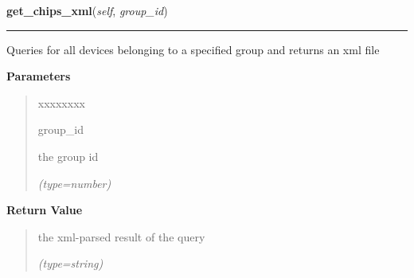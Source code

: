 \hspace{.8\funcindent}\begin{boxedminipage}{\funcwidth}

    \raggedright \textbf{get\_chips\_xml}(\textit{self}, \textit{group\_id})

    \vspace{-1.5ex}

    \rule{\textwidth}{0.5\fboxrule}
\setlength{\parskip}{2ex}
    Queries for all devices belonging to a specified group and returns an 
    xml file

\setlength{\parskip}{1ex}
      \textbf{Parameters}
      \vspace{-1ex}

      \begin{quote}
        \begin{Ventry}{xxxxxxxx}

          \item[group\_id]

          the group id

            {\it (type=number)}

        \end{Ventry}

      \end{quote}

      \textbf{Return Value}
    \vspace{-1ex}

      \begin{quote}
      the xml-parsed result of the query

      {\it (type=string)}

      \end{quote}

    \end{boxedminipage}

    \label{DBE:DBE:get_chips}

    \vspace{0.5ex}

